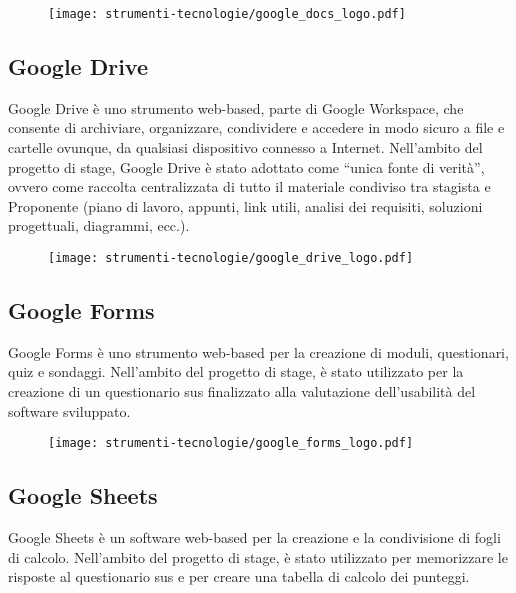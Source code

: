 \begin{figure}[H]
    \centering 
    \texttt{[image: strumenti-tecnologie/google\_docs\_logo.pdf]} 
\end{figure}

\subsection*{Google Drive}

\par Google Drive è uno strumento web-based, parte di Google Workspace, che consente di archiviare, organizzare, condividere e accedere in modo sicuro a file e cartelle ovunque, da qualsiasi dispositivo connesso a Internet. Nell’ambito del progetto di stage, Google Drive è stato adottato come “unica fonte di verità”, ovvero come raccolta centralizzata di tutto il materiale condiviso tra stagista e Proponente (piano di lavoro, appunti, link utili, analisi dei requisiti, soluzioni progettuali, diagrammi, ecc.).

\begin{figure}[H]
    \centering 
    \texttt{[image: strumenti-tecnologie/google\_drive\_logo.pdf]} 
\end{figure}

\subsection*{Google Forms}

\par Google Forms è uno strumento web-based per la creazione di moduli, questionari, quiz e sondaggi. Nell’ambito del progetto di stage, è stato utilizzato per la creazione di un questionario \gls{sus} finalizzato alla valutazione dell’usabilità del software sviluppato.

\begin{figure}[H]
    \centering 
    \texttt{[image: strumenti-tecnologie/google\_forms\_logo.pdf]} 
\end{figure}

\subsection*{Google Sheets}

\par Google Sheets è un software web-based per la creazione e la condivisione di fogli di calcolo. Nell’ambito del progetto di stage, è stato utilizzato per memorizzare le risposte al questionario \gls{sus} e per creare una tabella di calcolo dei punteggi.

